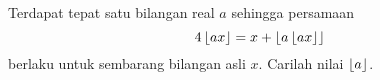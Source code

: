 Terdapat tepat satu bilangan real $a$ sehingga persamaan
$$4\left\lfloor ax \right\rfloor = x + \left\lfloor a\left\lfloor ax \right\rfloor \right\rfloor$$
berlaku untuk sembarang bilangan asli $x$. Carilah nilai $\left\lfloor a \right\rfloor$.